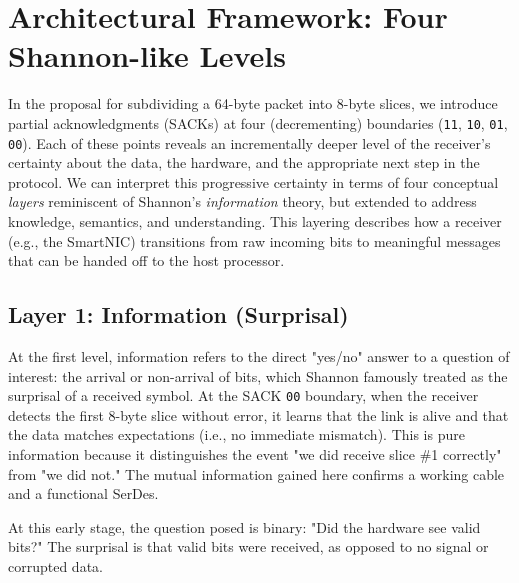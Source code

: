 \documentclass[../HFT-main.tex]{subfiles}
\begin{document}


\section*{Architectural Framework: Four Shannon-like Levels}

In the proposal for subdividing a 64-byte packet into 8-byte slices, we introduce partial acknowledgments (SACKs) at four (decrementing) boundaries (\texttt{11}, \texttt{10}, \texttt{01}, \texttt{00}). Each of these points reveals an incrementally deeper level of the receiver’s certainty about the data, the hardware, and the appropriate next step in the protocol. We can interpret this progressive certainty in terms of four conceptual \emph{layers} reminiscent of Shannon’s \emph{information} theory, but extended to address knowledge, semantics, and understanding. This layering describes how a receiver (e.g., the SmartNIC) transitions from raw incoming bits to meaningful messages that can be handed off to the host processor.


\subsection*{Layer 1: Information (Surprisal)}

At the first level, information refers to the direct "yes/no" answer to a question of interest: the arrival or non-arrival of bits, which Shannon famously treated as the surprisal of a received symbol. At the SACK \texttt{00} boundary, when the receiver detects the first 8-byte slice without error, it learns that the link is alive and that the data matches expectations (i.e., no immediate mismatch). This is pure information because it distinguishes the event "we did receive slice \#1 correctly" from "we did not." The mutual information gained here confirms a working cable and a functional SerDes.

At this early stage, the question posed is binary: "Did the hardware see valid bits?" The surprisal is that valid bits were received, as opposed to no signal or corrupted data.
\end{document}
